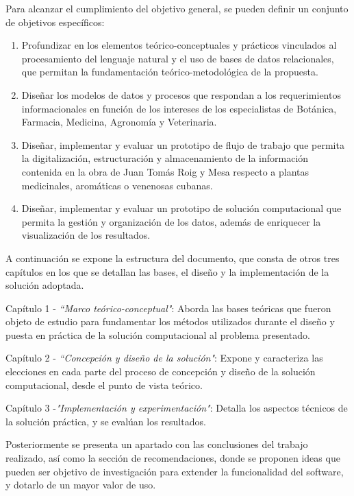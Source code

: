 Para alcanzar el cumplimiento del objetivo general, se pueden 
definir un conjunto de objetivos específicos:
\begin{enumerate}
    \item Profundizar en los elementos teórico-conceptuales y prácticos vinculados al 
    procesamiento del lenguaje natural y el uso de bases de datos relacionales, que permitan 
    la fundamentación teórico-metodológica de la propuesta.
    \item Diseñar los modelos de datos y procesos que respondan a los requerimientos 
    informacionales en función de los intereses de los especialistas de Botánica, 
    Farmacia, Medicina, Agronomía y Veterinaria.
    \item Diseñar, implementar y evaluar un prototipo de flujo de trabajo que permita 
    la digitalización, estructuración y almacenamiento de la información contenida 
    en la obra de Juan Tomás Roig y Mesa respecto a plantas medicinales, aromáticas o venenosas cubanas.
    \item Diseñar, implementar y evaluar un prototipo de solución computacional que 
    permita la gestión y organización de los datos, además de enriquecer la visualización 
    de los resultados.
\end{enumerate}

A continuación se expone la estructura del documento, que consta de otros tres capítulos 
en los que se detallan las bases, el diseño y la implementación de la solución adoptada.

Capítulo 1 - \textit{``Marco teórico-conceptual"}: Aborda las bases teóricas que fueron 
objeto de estudio para fundamentar los métodos utilizados durante el diseño y puesta en 
práctica de la solución computacional al problema presentado.

Capítulo 2 - \textit{``Concepción y diseño de la solución"}: Expone y caracteriza las 
elecciones en cada parte del proceso de concepción y diseño de la solución computacional, 
desde el punto de vista teórico.

Capítulo 3 -\textit{"Implementación y experimentación"}: Detalla los aspectos técnicos 
de la solución práctica, y se evalúan los resultados.

Posteriormente se presenta un apartado con las conclusiones del trabajo realizado, 
así como la sección de recomendaciones, donde se proponen ideas que pueden ser objetivo 
de investigación para extender la funcionalidad del software, y dotarlo de un mayor 
valor de uso.

